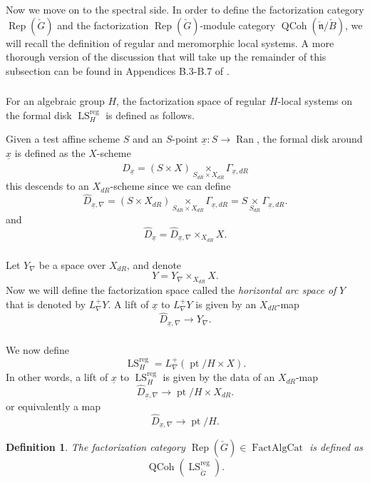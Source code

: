 \documentclass[10pt,a4paper]{amsart}
\newtheorem{defn}[subsubsection]{Definition}
\newtheorem{rem}[subsubsection]{Remark}
\newcommand{\on}[1]{\operatorname{#1}}
\newcommand{\QCoh}{\on{QCoh}}
\newcommand{\IndCoh}{\on{IndCoh}}
\newcommand{\ncheck}{\check{\mathfrak{n}}}
\newcommand{\Bcheck}{\check{B}}
\newcommand{\FactAlgCat}{\on{FactAlgCat}}
\newcommand{\sssec}[1]{\subsubsection{}}
\begin{document}
\sssec{}
Now we move on to the spectral side. In order to define the factorization category $\on{Rep}(\check{G})$ and the factorization $\on{Rep}(\check{G})$-module category $\QCoh(\ncheck/\Bcheck)$, we will recall the definition of regular and meromorphic local systems. A more thorough version of the discussion that will take up the remainder of this subsection can be found in Appendices B.3-B.7 of \cite{GLC2}.

\sssec{}
For an algebraic group $H$, the factorization space of regular $H$-local systems on the formal disk $\on{LS}_H^{\on{reg}}$ is defined as follows.

Given a test affine scheme $S$ and an $S$-point $\underline{x}: S \to \on{Ran}$, the formal disk around $\underline{x}$ is defined as the $X$-scheme
$$
    \hat{D}_{\underline{x}} = (S \times X) \underset{S_{dR} \times X_{dR}}{\times} \Gamma_{\underline{x}, dR}
$$
this descends to an $X_{dR}$-scheme since we can define
$$
     \hat{D}_{\underline{x}, \nabla} = (S \times X_{dR}) \underset{S_{dR} \times X_{dR}}{\times} \Gamma_{\underline{x}, dR} = S \underset{S_{dR}}{\times} \Gamma_{\underline{x}, dR}.
$$
and
$$
    \hat{D}_{\underline{x}} = \hat{D}_{\underline{x}, \nabla} \times_{X_{dR}} X.
$$

\sssec{}
Let $Y_{\nabla}$ be a space over $X_{dR}$, and denote
$$
Y = Y_{\nabla} \times_{X_{dR}} X.
$$
Now we will define the factorization space called the \emph{horizontal arc space of} $Y$ that is denoted by $L_{\nabla}^+Y$. A lift of $\underline{x}$ to $L_{\nabla}^+Y$ is given by an $X_{dR}$-map
$$
\hat{D}_{\underline{x}, \nabla} \to Y_{\nabla}.
$$

\sssec{}
We now define 
$$
\on{LS}_H^{\on{reg}} = L_{\nabla}^+(\on{pt}/H \times X).
$$
In other words, a lift of $\underline{x}$ to $\on{LS}_H^{\on{reg}}$ is given by the data of an $X_{dR}$-map
$$
\hat{D}_{\underline{x}, \nabla} \to \on{pt}/H \times X_{dR}.
$$
or equivalently a map
$$
\hat{D}_{\underline{x}, \nabla} \to \on{pt}/H.
$$

\begin{defn}
    The factorization category $\on{Rep}(\check{G}) \in \FactAlgCat$ is defined as 
    $$
    \QCoh(\on{LS}_{\check{G}}^{\on{reg}}).
    $$
\end{defn}

\end{document}
